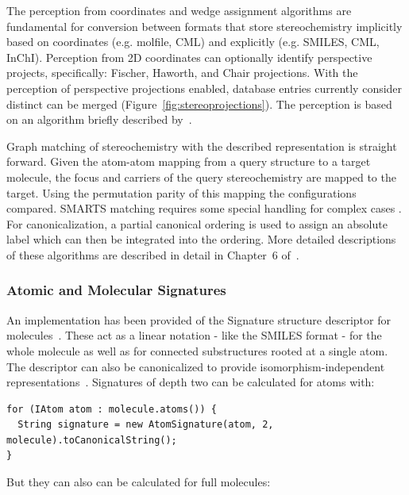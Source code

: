 \documentclass[doublespacing]{bmcart}
\begin{document}
  The perception from coordinates and wedge assignment algorithms are fundamental for conversion
  between formats that store stereochemistry implicitly based on coordinates (e.g. molfile, CML) and 
  explicitly (e.g. SMILES, CML, InChI). Perception from 2D coordinates can optionally identify
  perspective projects, specifically: Fischer, Haworth, and Chair projections. With the perception of 
  perspective projections enabled, database entries currently consider distinct can be merged
  (Figure~\ref{fig:stereoprojections}).  The perception is based on an  algorithm briefly  
  described by~\cite{Karapetyan2015}.


  Graph matching of stereochemistry with the described representation is straight forward. Given
  the atom-atom mapping from a query structure to a target molecule, the focus and carriers of 
  the query stereochemistry are mapped to the target. Using the permutation parity of this mapping
  the configurations compared. SMARTS matching requires some special handling for complex cases 
  \cite{May2014_SMARTS}. For canonicalization, a partial canonical ordering is used to assign an 
  absolute label which can then be integrated into the ordering. More detailed descriptions of 
  these algorithms are described in detail in Chapter~6 of~\cite{May2015}.

  \subsubsection*{Atomic and Molecular Signatures}

  An implementation has been provided of the Signature structure descriptor for
  molecules~\cite{Faulon2003}. These act as a linear notation - like the SMILES format - 
  for the whole molecule as well as for connected substructures rooted at a single atom. The 
  descriptor can also be canonicalized to provide isomorphism-independent
  representations~\cite{Faulon2004}. Signatures of depth two can be calculated
  for atoms with:

\vspace{0.2cm}
\begin{verbatim}
for (IAtom atom : molecule.atoms()) {
  String signature = new AtomSignature(atom, 2, molecule).toCanonicalString();
}
\end{verbatim}
\vspace{0.2cm}

  But they can also can be calculated for full molecules:
\end{document}
